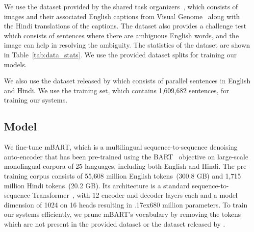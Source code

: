 \documentclass[11pt,a4paper]{article}
\newcommand{\approximately}{{\raise.17ex\hbox{}}}
\begin{document}
\begin{table}
\centering
{}
\caption{The statistics of the provided dataset. The average number of tokens in the source and target language are reported for all the sentence pairs.}
\label{tab:data_stats}
\end{table} 
We use the dataset provided by the shared task organizers~\citep{hindi-visual-genome:2019}, which consists of images and their associated English captions from Visual Genome~\citep{10.1007/s11263-016-0981-7} along with the Hindi translations of the captions. The dataset also provides a challenge test which consists of sentences where there are ambiguous English words, and the image can help in resolving the ambiguity. The statistics of the dataset are shown in Table~\ref{tab:data_stats}. We use the provided dataset splits for training our models.

We also use the dataset released by \citet{kunchukuttan-etal-2018-iit} which consists of parallel sentences in English and Hindi. We use the training set, which contains 1,609,682 sentences, for training our systems.

\subsection{Model}

We fine-tune mBART, which is a multilingual sequence-to-sequence denoising auto-encoder that has been pre-trained using the BART~\citep{lewis-etal-2020-bart} objective on large-scale monolingual corpora of 25 languages, including both English and Hindi. The pre-training corpus consists of 55,608 million English tokens~(300.8 GB) and 1,715 million Hindi tokens~(20.2 GB). Its architecture is a standard sequence-to-sequence Transformer~\citep{NIPS2017_3f5ee243}, with 12 encoder and decoder layers each and a model dimension of 1024 on 16 heads resulting in \approximately680 million parameters. To train our systems efficiently, we prune mBART's vocabulary by removing the tokens which are not present in the provided dataset or the dataset released by \citet{kunchukuttan-etal-2018-iit}.
\end{document}
